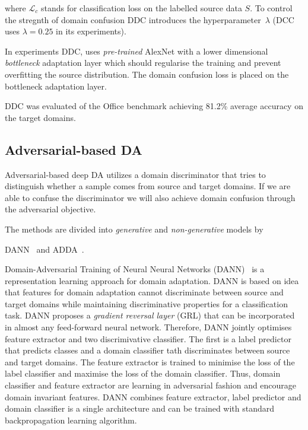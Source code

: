 where \(\mathcal{L}_c\) stands for classification loss on the labelled source data \(S\).
To control the stregnth of domain confusion DDC introduces the hyperparameter~\(\lambda\)
(DCC uses \(\lambda = 0.25\) in its experiments).

In experiments DDC, uses \textit{pre-trained} AlexNet with a lower dimensional \textit{bottleneck} adaptation layer
which should regularise the training
and prevent overfitting the source distribution.
The domain confusion loss is placed on the bottleneck adaptation layer.

DDC was evaluated of the Office benchmark achieving 81.2\% average accuracy on the target domains.

\subsection{Adversarial-based DA}

Adversarial-based deep DA utilizes a domain discriminator
that tries to distinguish whether a sample comes from source and target domains.
If we are able to confuse the discriminator
we will also achieve domain confusion through the adversarial objective.

The methods are divided into \textit{generative} and \textit{non-generative}
models by~\cite{wang2018}

DANN~\cite{ganin2016} and ADDA~\cite{tzeng2017}.

Domain-Adversarial Training of Neural Neural Networks (DANN)~\cite{ganin2016}
is a representation learning approach for domain adaptation.
DANN is based on idea that features for domain adaptation
cannot discriminate between source and target domains
while maintaining discriminative properties for a classification task.
DANN proposes a \textit{gradient reversal layer} (GRL)
that can be incorporated in almost any feed-forward neural network.
Therefore, DANN jointly optimises feature extractor
and two discrimivative classifier.
The first is a label predictor that predicts classes
and a domain classifier tath discriminates between source and target domains.
The feature extractor is trained to minimise the loss of the label classifier
and maximise the loss of the domain classifier.
Thus, domain classifier and feature extractor are learning in adversarial fashion and encourage domain invariant features.
DANN combines feature extractor, label predictor and domain classifier is a single architecture
and can be trained with standard backpropagation learning algorithm.

